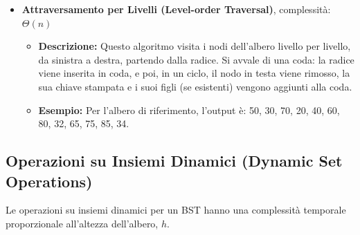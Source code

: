 \begin{itemize}
    \item \textbf{Attraversamento per Livelli (Level-order Traversal)}, complessità: $\Theta(n)$
    \begin{itemize}
        \item \textbf{Descrizione:} Questo algoritmo visita i nodi dell'albero livello per livello, da sinistra a destra, partendo dalla radice. Si avvale di una coda: la radice viene inserita in coda, e poi, in un ciclo, il nodo in testa viene rimosso, la sua chiave stampata e i suoi figli (se esistenti) vengono aggiunti alla coda.
        \item \textbf{Esempio:} Per l'albero di riferimento, l'output è: 50, 30, 70, 20, 40, 60, 80, 32, 65, 75, 85, 34.
    \end{itemize}
\end{itemize}

\subsection{Operazioni su Insiemi Dinamici (Dynamic Set Operations)}
Le operazioni su insiemi dinamici per un BST hanno una complessità temporale proporzionale all'altezza dell'albero, $h$.

